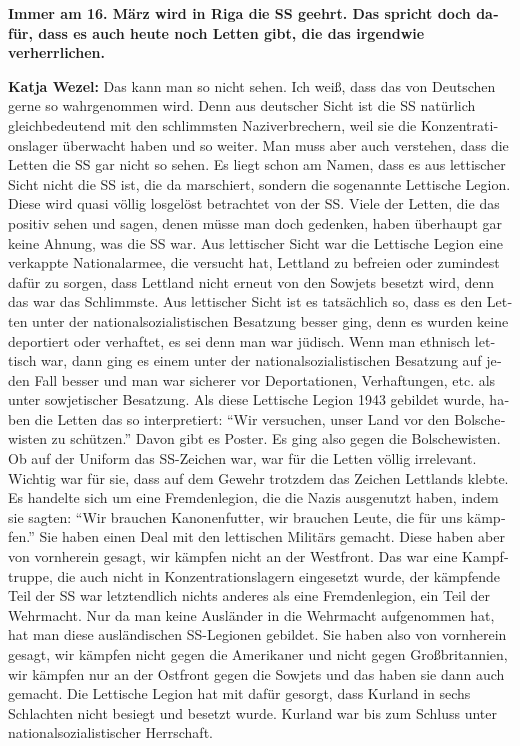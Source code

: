 \begin{otherlanguage}{ngerman}
\textbf{Immer am 16. März wird in Riga die SS geehrt. Das spricht doch dafür, dass es auch heute noch Letten gibt, die das irgendwie verherrlichen.} 

\textbf{Katja Wezel:} Das kann man so nicht sehen. Ich weiß, dass das von Deutschen gerne so wahrgenommen wird. Denn aus deutscher Sicht ist die SS natürlich gleichbedeutend mit den schlimmsten Naziverbrechern, weil sie die Konzentrationslager überwacht haben und so weiter. Man muss aber auch verstehen, dass die Letten die SS gar nicht so sehen. Es liegt schon am Namen, dass es aus lettischer Sicht nicht die SS ist, die da marschiert, sondern die sogenannte Lettische Legion. Diese wird quasi völlig losgelöst betrachtet von der SS. Viele der Letten, die das positiv sehen und sagen, denen müsse man doch gedenken, haben überhaupt gar keine Ahnung, was die SS war. Aus lettischer Sicht war die Lettische Legion eine verkappte Nationalarmee, die versucht hat, Lettland zu befreien oder zumindest dafür zu sorgen, dass Lettland nicht erneut von den Sowjets besetzt wird, denn das war das Schlimmste. Aus lettischer Sicht ist es tatsächlich so, dass es den Letten unter der nationalsozialistischen Besatzung besser ging, denn es wurden keine deportiert oder verhaftet, es sei denn man war jüdisch. Wenn man ethnisch lettisch war, dann ging es einem unter der nationalsozialistischen Besatzung auf jeden Fall besser und man war sicherer vor Deportationen, Verhaftungen, etc. als unter sowjetischer Besatzung. Als diese Lettische Legion 1943 gebildet wurde, haben die Letten das so interpretiert: "`Wir versuchen, unser Land vor den Bolschewisten zu schützen."' Davon gibt es Poster. Es ging also gegen die Bolschewisten. Ob auf der Uniform das SS-Zeichen war, war für die Letten völlig irrelevant. Wichtig war für sie, dass auf dem Gewehr trotzdem das Zeichen Lettlands klebte. Es handelte sich um eine Fremdenlegion, die die Nazis ausgenutzt haben, indem sie sagten: "`Wir brauchen Kanonenfutter, wir brauchen Leute, die für uns kämpfen."' Sie haben einen Deal mit den lettischen Militärs gemacht. Diese haben aber von vornherein gesagt, wir kämpfen nicht an der Westfront. Das war eine Kampftruppe, die auch nicht in Konzentrationslagern eingesetzt wurde, der kämpfende Teil der SS war letztendlich nichts anderes als eine Fremdenlegion, ein Teil der Wehrmacht. Nur da man keine Ausländer in die Wehrmacht aufgenommen hat, hat man diese ausländischen SS-Legionen gebildet. Sie haben also von vornherein gesagt, wir kämpfen nicht gegen die Amerikaner und nicht gegen Großbritannien, wir kämpfen nur an der Ostfront gegen die Sowjets und das haben sie dann auch gemacht. Die Lettische Legion hat mit dafür gesorgt, dass Kurland in sechs Schlachten nicht besiegt und besetzt wurde. Kurland war bis zum Schluss unter nationalsozialistischer Herrschaft. 

\end{otherlanguage}
